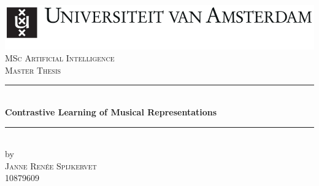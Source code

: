 \begin{titlepage}
    \begin{fullwidth}
        \newcommand{\HRule}{\rule{\linewidth}{0.5mm}} %
        \center %
        
        
        \includegraphics[width=\linewidth]{images/uva.jpeg}\\[2.5cm]
        \textsc{\Large MSc Artificial Intelligence}\\[0.2cm]
        \textsc{\Large Master Thesis}\\[0.5cm] 
        
        
        \HRule \\[0.4cm]
        { \huge \bfseries Contrastive Learning of Musical Representations}\\[0.4cm] %
        \HRule \\[0.5cm]
        
        
        by\\[0.2cm]
        \textsc{\Large Janne Renée Spijkervet}\\[0.2cm] %
        10879609\\[1cm]
        
        
        

\end{fullwidth}
\end{titlepage}
